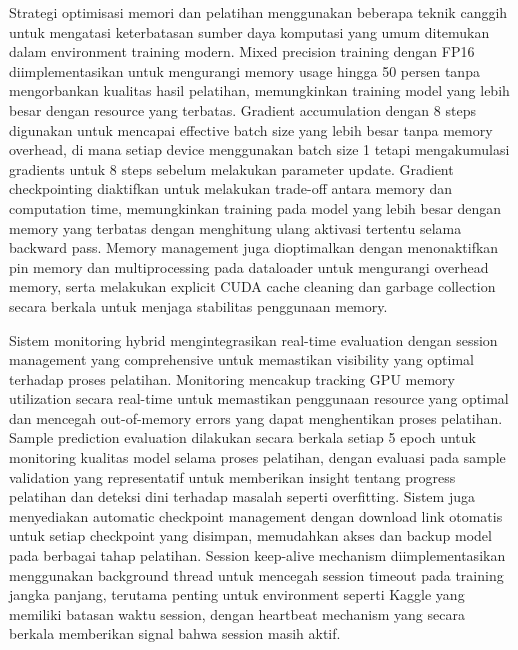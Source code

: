 Strategi optimisasi memori dan pelatihan menggunakan beberapa teknik canggih untuk mengatasi keterbatasan sumber daya komputasi yang umum ditemukan dalam environment training modern. Mixed precision training dengan FP16 diimplementasikan untuk mengurangi memory usage hingga 50 persen tanpa mengorbankan kualitas hasil pelatihan, memungkinkan training model yang lebih besar dengan resource yang terbatas. Gradient accumulation dengan 8 steps digunakan untuk mencapai effective batch size yang lebih besar tanpa memory overhead, di mana setiap device menggunakan batch size 1 tetapi mengakumulasi gradients untuk 8 steps sebelum melakukan parameter update. Gradient checkpointing diaktifkan untuk melakukan trade-off antara memory dan computation time, memungkinkan training pada model yang lebih besar dengan memory yang terbatas dengan menghitung ulang aktivasi tertentu selama backward pass. Memory management juga dioptimalkan dengan menonaktifkan pin memory dan multiprocessing pada dataloader untuk mengurangi overhead memory, serta melakukan explicit CUDA cache cleaning dan garbage collection secara berkala untuk menjaga stabilitas penggunaan memory.

Sistem monitoring hybrid mengintegrasikan real-time evaluation dengan session management yang comprehensive untuk memastikan visibility yang optimal terhadap proses pelatihan. Monitoring mencakup tracking GPU memory utilization secara real-time untuk memastikan penggunaan resource yang optimal dan mencegah out-of-memory errors yang dapat menghentikan proses pelatihan. Sample prediction evaluation dilakukan secara berkala setiap 5 epoch untuk monitoring kualitas model selama proses pelatihan, dengan evaluasi pada sample validation yang representatif untuk memberikan insight tentang progress pelatihan dan deteksi dini terhadap masalah seperti overfitting. Sistem juga menyediakan automatic checkpoint management dengan download link otomatis untuk setiap checkpoint yang disimpan, memudahkan akses dan backup model pada berbagai tahap pelatihan. Session keep-alive mechanism diimplementasikan menggunakan background thread untuk mencegah session timeout pada training jangka panjang, terutama penting untuk environment seperti Kaggle yang memiliki batasan waktu session, dengan heartbeat mechanism yang secara berkala memberikan signal bahwa session masih aktif.

